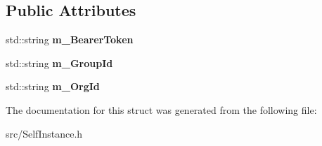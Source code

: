 \subsection*{Public Attributes}
\begin{DoxyCompactItemize}
\item 
\mbox{\label{struct_self_instance_1_1_embodiment_creds_a14fcc7ff988602dae9d35193a6b4bca3}} 
std\+::string {\bfseries m\+\_\+\+Bearer\+Token}
\item 
\mbox{\label{struct_self_instance_1_1_embodiment_creds_a504410b9d8768adaa47587f60af72257}} 
std\+::string {\bfseries m\+\_\+\+Group\+Id}
\item 
\mbox{\label{struct_self_instance_1_1_embodiment_creds_a6f71b45ec9eac461e15e5b83bc8b5003}} 
std\+::string {\bfseries m\+\_\+\+Org\+Id}
\end{DoxyCompactItemize}


The documentation for this struct was generated from the following file\+:\begin{DoxyCompactItemize}
\item 
src/Self\+Instance.\+h\end{DoxyCompactItemize}
